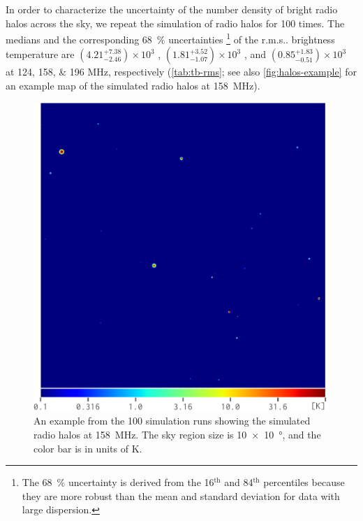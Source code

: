 \documentclass[twocolumn]{aastex62}
\makeatletter
\newcommand{\rms}{r.m.s\@ifnextchar.{}{.\@}}
\newcommand{\editone}[1]{{\leavevmode\color{cyan}#1}}
\makeatother
\begin{document}
In order to characterize the uncertainty of the number density of bright
radio halos across the sky, we repeat the simulation of radio halos
for 100 times.
The medians and the corresponding \SI{68}{\percent} uncertainties%
\footnote{%
  The \SI{68}{\percent} uncertainty is derived from the 16$^{\text{th}}$
  and 84$^{\text{th}}$ percentiles because they are more robust than the
  mean and standard deviation for data with large dispersion.}
of the \rms{} brightness temperature are \editone{%
$\left(4.21_{-2.46}^{+7.38}\right) \times 10^3$ \si{\mK},
$\left(1.81_{-1.07}^{+3.52}\right) \times 10^3$ \si{\mK}, and
$\left(0.85_{-0.51}^{+1.83}\right) \times 10^3$ \si{\mK}}
at \numlist{124; 158; 196} \si{\MHz}, respectively
(\autoref{tab:tb-rms}; see also \autoref{fig:halos-example} for an
example map of the simulated radio halos at \SI{158}{\MHz}).

\begin{figure}
  \centering
  \includegraphics[width=\columnwidth]{halos-f158}
  \caption{\label{fig:halos-example}%
    An example from the 100 simulation runs showing the simulated
    radio halos at \SI{158}{\MHz}.
    The sky region size is \SI[product-units=repeat]{10 x 10}{\degree},
    and the color bar is in units of \si{\kelvin}.
  }
\end{figure}
\end{document}
